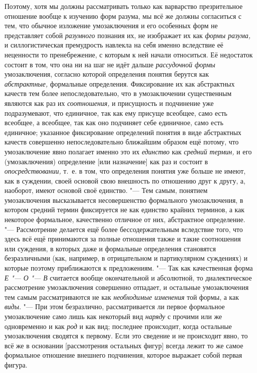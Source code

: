Поэтому, хотя мы должны рассматривать только как варварство
презрительное отношение вообще к изучению форм разума, мы всё же должны
согласиться с тем, что обычное изложение умозаключения и его особенных форм
не представляет собой {\em разумного}
познания их, не изображает их как
{\em формы разума,} и
силлогистическая премудрость навлекла на себя именно вследствие её
неценности то пренебрежение, с которым к ней начали относиться. Её
недостаток состоит в том, что она ни на шаг не идёт дальше
{\em рассудочной формы}
умозаключения, согласно которой определения понятия берутся
как {\em абстрактные,}
формальные определения. Фиксирование их как абстрактных
качеств тем более непоследовательно, что в умозаключении существенным
являются как раз их {\em соотношения,}
и присущность и подчинение уже подразумевают, что единичное,
так как ему присуще всеобщее, само есть всеобщее, а всеобщее, так как оно
подчиняет себе единичное, само есть единичное; указанное фиксирование
определений понятия в виде абстрактных качеств совершенно непоследовательно
ближайшим образом ещё потому, что умозаключение явно полагает именно это их
{\em единство} как
{\em средний термин,} и
его (умозаключения) определение [или назначение] как раз и состоит в
{\em опосредствовании,}
т.~е. в том, что определения понятия уже больше не имеют, как
в суждении, своей основой свою внешность по отношению друг к другу, а,
наоборот, имеют основой своё единство. "--- Тем самым, понятием
умозаключения высказывается несовершенство формального умозаключения, в
котором средний термин фиксируется не как единство крайних терминов, а как
некоторое формальное, качественно отличное от них, абстрактное
определение. "--- Рассмотрение делается ещё более
бессодержательным вследствие того, что здесь всё ещё принимаются за полные
отношения также и такие соотношения или суждения, в которых даже и
формальные определения становятся безразличными (как, например, в
отрицательном и партикулярном суждениях) и которые поэтому приближаются к
предложениям. "--- Так как качественная форма
{\em Е "--- О "--- В} считается вообще окончательной и
абсолютной, то диалектическое рассмотрение умозаключения совершенно
отпадает, и остальные умозаключения тем самым рассматриваются не как
{\em необходимые изменения}
той формы, а как
{\em виды}. "--- При этом
безразлично, рассматривается ли первое формальное умозаключение само лишь
как некоторый вид {\em наряду}
с прочими или же одновременно и как
{\em род} и как вид;
последнее происходит, когда остальные умозаключения сводятся к первому.
Если это сведение и не происходит явно, то всё же в основании [рассмотрения
остальных фигур] всегда лежит то же самое формальное отношение внешнего
подчинения, которое выражает собой первая фигура.

